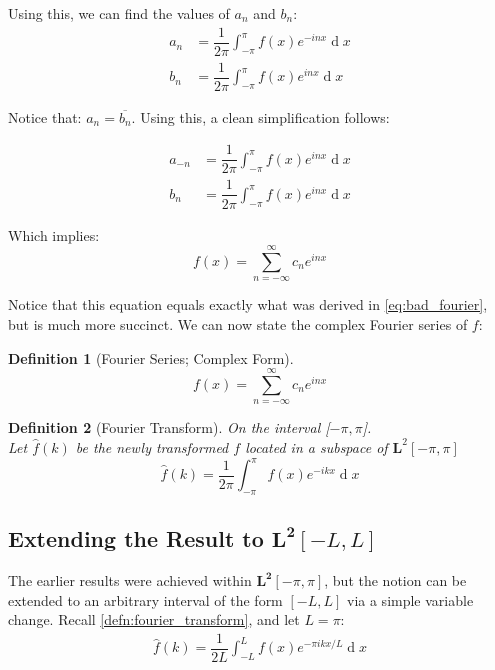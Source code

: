 \documentclass[12pt,a4paper]{report}
\DeclareMathOperator{\deriv}{d}
\theoremstyle{thms}
\theoremstyle{defns}
\newtheorem{definition}{Definition}[section]
\begin{document}
Using this, we can find the values of $a_n$ and $b_n$:
\begin{align}
    a_n & = \dfrac{1}{2\pi}\int_{-\pi}^{\pi}f(x)e^{-inx}\deriv{x}  \\
    b_n & = \dfrac{1}{2\pi}\int_{-\pi}^{\pi}f(x)e^{inx}\deriv{x}
\end{align}

Notice that: $a_n = \overline{b_n}$. Using this, a clean simplification follows:

\begin{align}
    a_{-n} & = \dfrac{1}{2\pi}\int_{-\pi}^{\pi}f(x)e^{inx}\deriv{x} \\
    b_n    & = \dfrac{1}{2\pi}\int_{-\pi}^{\pi}f(x)e^{inx}\deriv{x}
\end{align}

Which implies:
\begin{equation}
    f(x) = \sum_{n=-\infty}^{\infty} c_ne^{inx}
\end{equation}


Notice that this equation equals exactly what was derived in \eqref{eq:bad_fourier}, but is much more succinct. We can now state the complex Fourier series of $f$:
\begin{definition}[Fourier Series; Complex Form]
    \begin{equation}
        f(x) = \sum_{n=-\infty}^{\infty} c_ne^{inx}
    \end{equation}
\end{definition}

\begin{definition}[Fourier Transform]
    On the interval [$-\pi, \pi$].\\
    Let $\hat{f}(k)$ be the newly transformed $f$ located in a subspace of $\mathbf{L}^2[-\pi, \pi]$
    \begin{equation}
        \hat{f}(k) = \dfrac{1}{2\pi}\int_{-\pi}^{\pi} f(x)e^{-ikx}\deriv{x}
        \label{defn:fourier_transform}
    \end{equation}
\end{definition}

\subsection{Extending the Result to $\mathbf{L^2}[-L, L]$}
The earlier results were achieved within $\mathbf{L^2}[-\pi, \pi]$, but the notion can be extended to an arbitrary interval of the form $[-L, L]$ via a simple variable change. Recall \eqref{defn:fourier_transform}, and let $L = \pi$:
\begin{align}
    \hat{f}(k) = \dfrac{1}{2L}\int_{-L}^{L} f(x)e^{-\pi ikx/L}\deriv{x}
\end{align}
\end{document}
